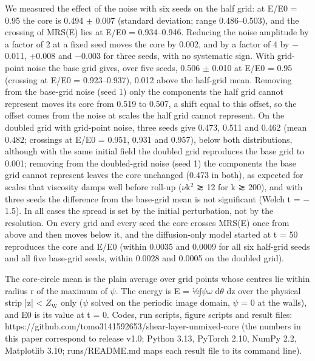 \documentclass[11pt]{article}
\begin{document}
We measured the effect of the noise with six seeds on the half grid: at E/E0 = 0.95 the core is 0.494 $\pm{}$ 0.007 (standard deviation; range 0.486--0.503), and the crossing of MRS(E) lies at E/E0 = 0.934--0.946. Reducing the noise amplitude by a factor of 2 at a fixed seed moves the core by 0.002, and by a factor of 4 by $-$0.011, +0.008 and $-$0.003 for three seeds, with no systematic sign. With grid-point noise the base grid gives, over five seeds, 0.506 $\pm{}$ 0.010 at E/E0 = 0.95 (crossing at E/E0 = 0.923--0.937), 0.012 above the half-grid mean. Removing from the base-grid noise (seed 1) only the components the half grid cannot represent moves its core from 0.519 to 0.507, a shift equal to this offset, so the offset comes from the noise at scales the half grid cannot represent. On the doubled grid with grid-point noise, three seeds give 0.473, 0.511 and 0.462 (mean 0.482; crossings at E/E0 = 0.951, 0.931 and 0.957), below both distributions, although with the same initial field the doubled grid reproduces the base grid to 0.001; removing from the doubled-grid noise (seed 1) the components the base grid cannot represent leaves the core unchanged (0.473 in both), as expected for scales that viscosity damps well before roll-up ($\nu{}$k$^{2}$ ≳ 12 for k ≳ 200), and with three seeds the difference from the base-grid mean is not significant (Welch t = $-$1.5). In all cases the spread is set by the initial perturbation, not by the resolution. On every grid and every seed the core crosses MRS(E) once from above and then moves below it, and the diffusion-only model started at t = 50 reproduces the core and E/E0 (within 0.0035 and 0.0009 for all six half-grid seeds and all five base-grid seeds, within 0.0028 and 0.0005 on the doubled grid).

The core-circle mean is the plain average over grid points whose centres lie within radius r of the maximum of $\psi{}$. The energy is E = ½∫$\psi{}\omega{}$ d$\theta{}$ dz over the physical strip |z| < $Z_{\mathrm{W}}$ only ($\psi{}$ solved on the periodic image domain, $\psi{}$ = 0 at the walls), and E0 is its value at t = 0. Codes, run scripts, figure scripts and result files: https://github.com/tomo3141592653/shear-layer-unmixed-core (the numbers in this paper correspond to release v1.0; Python 3.13, PyTorch 2.10, NumPy 2.2, Matplotlib 3.10; runs/README.md maps each result file to its command line).
\end{document}
